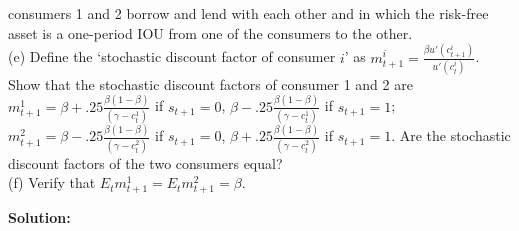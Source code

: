 \documentclass[12pt, letterpaper]{article}
\begin{document}
\begin{tcolorbox}[oddbox,title={Exercise 2.27 \quad Permanent Income Model Again}]
\begin{tcolorbox}[questionbox]
consumers 1 and 2 borrow and lend with each other and in which the risk-free asset is a one-period IOU
from one of the consumers to the other.\\
(e) Define the `stochastic discount factor of consumer $i$' as $m^i_{t+1}=\frac{\beta u'(c^i_{t+1})}{u'(c^i_t)}$.
Show that the stochastic discount factors of consumer 1 and 2 are
$m^1_{t+1}=\beta+.25\frac{\beta(1-\beta)}{(\gamma-c^1_t)}$ if $s_{t+1}=0$, $\beta-.25\frac{\beta(1-\beta)}{(\gamma-c^1_t)}$
if $s_{t+1}=1$; $m^2_{t+1}=\beta-.25\frac{\beta(1-\beta)}{(\gamma-c^2_t)}$ if $s_{t+1}=0$,
$\beta+.25\frac{\beta(1-\beta)}{(\gamma-c^2_t)}$ if $s_{t+1}=1$. Are the stochastic discount factors of the
two consumers equal?\\
(f) Verify that $E_tm^1_{t+1}=E_tm^2_{t+1}=\beta$.
\end{tcolorbox}

\textbf{Solution:}


\end{tcolorbox}
\end{document}
